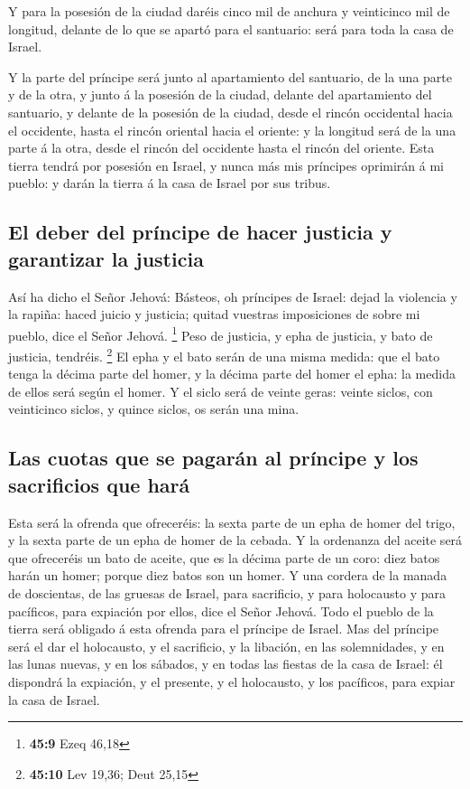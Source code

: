 Y para la posesión de la ciudad daréis cinco mil de anchura
y veinticinco mil de longitud, delante de lo que se apartó para el
santuario: será para toda la casa de Israel.

 Y la parte del príncipe será junto al apartamiento del
santuario, de la una parte y de la otra, y junto á la posesión de la
ciudad, delante del apartamiento del santuario, y delante de la posesión
de la ciudad, desde el rincón occidental hacia el occidente, hasta el
rincón oriental hacia el oriente: y la longitud será de la una parte á
la otra, desde el rincón del occidente hasta el rincón del oriente.
 Esta tierra tendrá por posesión en Israel, y nunca más mis
príncipes oprimirán á mi pueblo: y darán la tierra á la casa de Israel
por sus tribus.

\hypertarget{el-deber-del-pruxedncipe-de-hacer-justicia-y-garantizar-la-justicia}{%
\subsection{El deber del príncipe de hacer justicia y garantizar la
justicia}\label{el-deber-del-pruxedncipe-de-hacer-justicia-y-garantizar-la-justicia}}

 Así ha dicho el Señor Jehová: Básteos, oh príncipes de
Israel: dejad la violencia y la rapiña: haced juicio y justicia; quitad
vuestras imposiciones de sobre mi pueblo, dice el Señor Jehová.
\footnote{\textbf{45:9} Ezeq 46,18}  Peso de justicia, y
epha de justicia, y bato de justicia, tendréis. \footnote{\textbf{45:10}
  Lev 19,36; Deut 25,15}  El epha y el bato serán de una
misma medida: que el bato tenga la décima parte del homer, y la décima
parte del homer el epha: la medida de ellos será según el homer.
 Y el siclo será de veinte geras: veinte siclos, con
veinticinco siclos, y quince siclos, os serán una mina.

\hypertarget{las-cuotas-que-se-pagaruxe1n-al-pruxedncipe-y-los-sacrificios-que-haruxe1}{%
\subsection{Las cuotas que se pagarán al príncipe y los sacrificios que
hará}\label{las-cuotas-que-se-pagaruxe1n-al-pruxedncipe-y-los-sacrificios-que-haruxe1}}

 Esta será la ofrenda que ofreceréis: la sexta parte de un
epha de homer del trigo, y la sexta parte de un epha de homer de la
cebada.  Y la ordenanza del aceite será que ofreceréis un
bato de aceite, que es la décima parte de un coro: diez batos harán un
homer; porque diez batos son un homer.  Y una cordera de la
manada de doscientas, de las gruesas de Israel, para sacrificio, y para
holocausto y para pacíficos, para expiación por ellos, dice el Señor
Jehová.  Todo el pueblo de la tierra será obligado á esta
ofrenda para el príncipe de Israel.  Mas del príncipe será
el dar el holocausto, y el sacrificio, y la libación, en las
solemnidades, y en las lunas nuevas, y en los sábados, y en todas las
fiestas de la casa de Israel: él dispondrá la expiación, y el presente,
y el holocausto, y los pacíficos, para expiar la casa de Israel.

